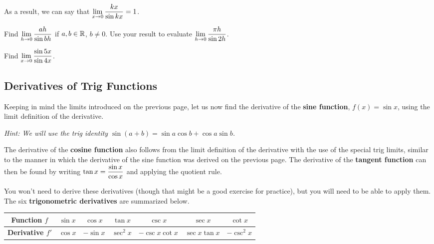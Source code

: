 \documentclass[12pt]{article}
\begin{document}

\vspace{5mm}

As a result, we can say that $\displaystyle\lim_{x\to 0}\frac{kx}{\sin kx}=1$.

\Example Find $\displaystyle\lim_{h\to 0}\frac{ah}{\sin bh}$ if $a,b\in\mathbb{R}$, $b\neq 0$. Use your result to evaluate $\displaystyle\lim_{h\to 0}\frac{\pi h}{\sin 2h}$.

\newpage

\Example Find $\displaystyle\lim_{x\to 0}\frac{\sin 5x}{\sin 4x}$.

\vspace{40mm}

\subsection*{Derivatives of Trig Functions}

Keeping in mind the limits introduced on the previous page, let us now find the derivative of the \textbf{sine function}, $f(x)=\sin x$, using the limit definition of the derivative. 

\vspace{3mm}

\textit{Hint: We will use the trig identity $\sin(a+b)=\sin a\cos b+\cos a\sin b$.}

\newpage

The derivative of the \textbf{cosine function} also follows from the limit definition of the derivative with the use of the special trig limits, similar to the manner in which the derivative of the sine function was derived on the previous page. The derivative of the \textbf{tangent function} can then be found by writing $\tan x=\displaystyle\frac{\sin x}{\cos x}$ and applying the quotient rule.

\vspace{5mm}

You won't need to derive these derivatives (though that might be a good exercise for practice), but you will need to be able to apply them. The six \textbf{trigonometric derivatives} are summarized below.

\vspace{3mm}

\begin{center}
\renewcommand{\arraystretch}{1.5}
\begin{tabular}{|c|c|c|c|c|c|c|}
\hline
\textbf{Function $f$}    & $\sin x$ & $\cos x$  & $\tan x$  & $\csc x$        & $\sec x$       & $\cot x$   \\ \hline
\textbf{Derivative $f'$} & $\cos x$ & $-\sin x$ & $\sec^2 x$ & $-\csc x \cot x$ & $\sec x \tan x$ & $-\csc^2 x$ \\ \hline
\end{tabular}
\end{center}
\end{document}
